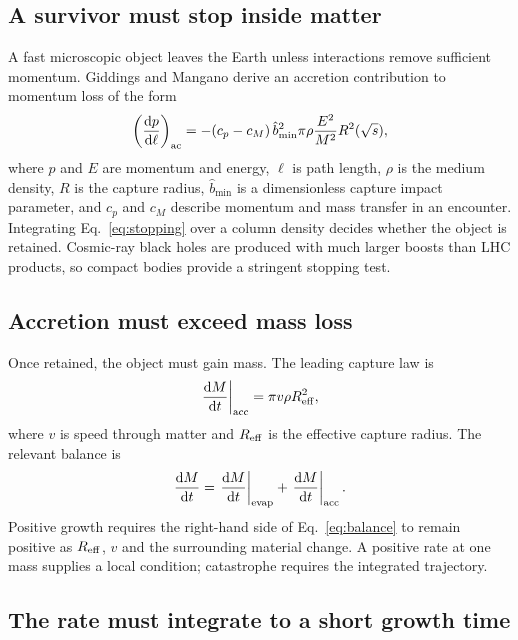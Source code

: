 \documentclass[10pt]{article}
\newcommand{\ud}{\mathrm{d}}
\begin{document}
\subsection{A survivor must stop inside matter}

A fast microscopic object leaves the Earth unless interactions remove sufficient momentum. Giddings and Mangano derive an accretion contribution to momentum loss of the form \cite{GiddingsMangano2008}
\begin{equation}
\left(\frac{\ud p}{\ud\ell}\right)_{\rm ac}
=-(c_{p}-c_{M})\,\hat b_{\min}^2\pi\rho
\frac{E^2}{M^2}R^2(\sqrt{s}),
\label{eq:stopping}
\end{equation}
where $p$ and $E$ are momentum and energy, $\ell$ is path length, $\rho$ is the medium density, $R$ is the capture radius, $\hat b_{\min}$ is a dimensionless capture impact parameter, and $c_p$ and $c_M$ describe momentum and mass transfer in an encounter. Integrating Eq.~\eqref{eq:stopping} over a column density decides whether the object is retained. Cosmic-ray black holes are produced with much larger boosts than LHC products, so compact bodies provide a stringent stopping test.

\subsection{Accretion must exceed mass loss}

Once retained, the object must gain mass. The leading capture law is \cite{Casadio2009,GiddingsMangano2008}
\begin{equation}
\left.\frac{\ud M}{\ud t}\right|_{\rm acc}
=\pi v\rho R_{\rm eff}^2,
\label{eq:accretion}
\end{equation}
where $v$ is speed through matter and $R_{\rm eff}$ is the effective capture radius. The relevant balance is
\begin{equation}
\frac{\ud M}{\ud t}=
\left.\frac{\ud M}{\ud t}\right|_{\rm evap}+
\left.\frac{\ud M}{\ud t}\right|_{\rm acc}.
\label{eq:balance}
\end{equation}
Positive growth requires the right-hand side of Eq.~\eqref{eq:balance} to remain positive as $R_{\rm eff}$, $v$ and the surrounding material change. A positive rate at one mass supplies a local condition; catastrophe requires the integrated trajectory.

\subsection{The rate must integrate to a short growth time}
\end{document}
